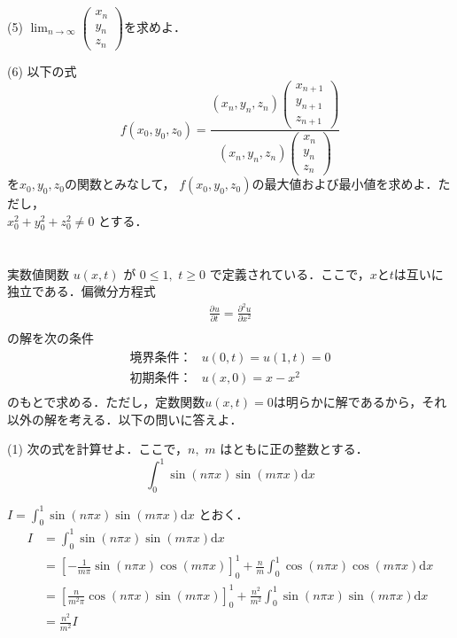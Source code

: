 \documentclass[a4j]{jarticle}
\let \ds \displaystyle
\newcommand{\pdiff}[3]{
  \frac{\partial^{#1} #2}{\partial #3^{#1}}
}
\begin{document}
\begin{screen}
 (5) $\ds \lim_{n\rightarrow\infty}\begin{pmatrix} x_n \\ y_n \\ z_n \end{pmatrix}$を求めよ．
\end{screen}

\begin{screen}
 (6) 以下の式
 $$f(x_0,y_0,z_0)=\frac{(x_n,y_n,z_n)\begin{pmatrix} x_{n+1} \\ y_{n+1} \\ z_{n+1} \end{pmatrix}}{(x_n,y_n,z_n)\begin{pmatrix} x_n \\ y_n \\ z_n \end{pmatrix}}$$
 を$x_0,y_0,z_0$の関数とみなして， $f(x_0,y_0,z_0)$の最大値および最小値を求めよ．ただし，\\ $x_0^2+y_0^2+z_0^2 \neq 0$ とする．
\end{screen}

\section{}

\begin{screen}
 実数値関数 $u(x,t)$ が $0 \leq 1,$ $t\geq 0$ で定義されている．ここで，$x$と$t$は互いに独立である．偏微分方程式
\begin{align*}
 \pdiff{}{u}{t} = \pdiff{2}{u}{x} \tag{$\ast$} \\
\end{align*}
 の解を次の条件
 \begin{align*}
  \mbox{境界条件：} & u(0,t) = u(1,t) = 0 \\
  \mbox{初期条件：} & u(x,0) = x-x^2\\
 \end{align*}
 のもとで求める．ただし，定数関数$u(x,t)=0$は明らかに解であるから，それ以外の解を考える．以下の問いに答えよ．
\end{screen}


\begin{screen}
 (1) 次の式を計算せよ．ここで，$n,$ $m$ はともに正の整数とする．
 $$\int_0^1 \sin(n \pi x) \sin(m \pi x) \mathrm{d}x$$
\end{screen}

$\ds I = \int_0^1 \sin(n \pi x) \sin(m \pi x) \mathrm{d}x$ とおく．
\begin{align*}
 I &= \int_0^1 \sin(n \pi x) \sin(m \pi x) \mathrm{d}x \\
 &= \left[- \frac{1}{m \pi} \sin(n \pi x) \cos(m \pi x)\right]_0^1 + \frac{n}{m} \int_0^1 \cos(n \pi x) \cos(m \pi x) \mathrm{d} x \\
 &= \left[\frac{n}{m^2 \pi } \cos(n \pi x)\sin(m \pi x)\right]_0^1 + \frac{n^2}{m^2} \int_0^1 \sin(n \pi x) \sin(m \pi x) \mathrm{d}x \\
 &= \frac{n^2}{m^2} I 
\end{align*}
\end{document}
